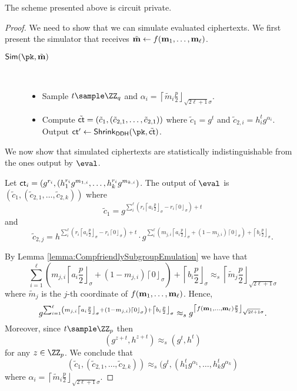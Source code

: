 \begin{lemma}
The scheme presented above is circuit private.
\end{lemma}
\begin{proof}

We need to show that we can simulate evaluated ciphertexts. We first present the simulator that receives $\tilde {\mathbf{m}}\leftarrow f(\mathbf{m}_1,\dots, \mathbf{m}_\ell)$. 

\begin{description}
\item[$\Sim(\pk,\tilde \mn)$]~
\begin{itemize}
    \item Sample $t\sample \ZZ_q$ and $\alpha_i=\left\lceil \tilde m_i\frac{p}{2}\right\rfloor_{\sqrt{2\ell+1}\sigma}$.
    \item Compute $\tilde {\mathsf{ct}}=(\tilde c_1,(\tilde c_{2,1},\dots,\tilde c_{2,1}))$ where $\tilde c_1=g^t$ and $\tilde c_{2,i}=h_i^tg^{\alpha_i}$. Output $ \ct'\leftarrow\shrink_\mathsf{DDH}(\pk,\tilde \ct)$.
\end{itemize}
\end{description}

We now show that simulated ciphertexts are statistically indistinguishable from the ones output by $\eval$. 

Let $\mathsf{ct}_i=(g^{r_i},(h_1^{r_i}g^{m_{1,i}},\dots,h_k^{r_i}g^{m_{k,i}})$. The output of $\eval$ is $(\tilde c_1,(\tilde c_{2,1},\dots, \tilde c_{2,k}))$ where $$\tilde c_1=g^{\sum_i^\ell \left(r_i\left\lceil a_i\frac{p}{2}\right\rfloor_\sigma - r_i\left\lceil 0\right\rfloor_\sigma\right) + t}$$ and $$\tilde c_{2,j}=h^{\sum_i^\ell \left(r_i\left\lceil a_i\frac{p}{2}\right\rfloor_\sigma - r_i\left\lceil 0\right\rfloor_\sigma\right) + t}\cdot g^{\sum_i^\ell \left(m_{j,i}\left\lceil a_i\frac{p}{2}\right\rfloor_\sigma +(1-m_{j,i})\left\lceil 0\right\rfloor_\sigma\right) + \left\lceil b_i\frac{p}{2}\right\rfloor_\sigma}.$$


By Lemma \ref{lemma:CompfriendlySubgroupEmulation} we have that $$\sum_{i=1}^\ell  \left(m_{j,i}\left\lceil a_i\frac{p}{2}\right\rfloor_\sigma +(1-m_{j,i})\left\lceil 0\right\rfloor_\sigma\right) + \left\lceil b_i\frac{p}{2}\right\rfloor_\sigma\approx_s \left\lceil \tilde m_j \frac{p}{2}\right\rfloor_{\sqrt{2\ell+1}\sigma}$$ where $\tilde m_j$ is the $j$-th coordinate of $f(\mathbf{m}_1,\dots, \mathbf{m}_\ell)$. Hence, $$g^{\sum_{i=1}^\ell  \left(m_{j,i}\left\lceil a_i\frac{p}{2}\right\rfloor_\sigma +(1-m_{j,i})\left\lceil 0\right\rfloor_\sigma\right) + \left\lceil b_i\frac{p}{2}\right\rfloor_\sigma}\approx_s g^{\left\lceil f(\mathbf{m}_1,\dots,\mathbf{m}_\ell) \frac{p}{2}\right\rfloor_{\sqrt{2\ell+1}\sigma}}.$$ Moreover, since $t\sample \ZZ_p$ then $$(g^{z+t},h^{z+t})\approx_s(g^t,h^t)$$ for any $z\in\ZZ_p$. We conclude that $$(\tilde c_1,(\tilde c_{2,1},\dots, \tilde c_{2,k}))\approx_s (g^t,(h_1^tg^{\alpha_1},\dots, h_k^tg^{\alpha_k})$$ where $\alpha_i=\left\lceil \tilde m_i\frac{p}{2}\right\rfloor_{\sqrt{2\ell+1}\sigma}$.
\end{proof}


